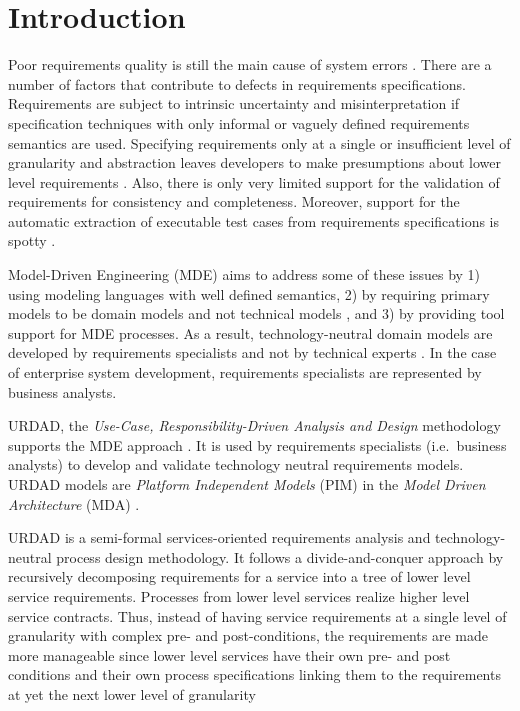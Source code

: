 \section{Introduction}

Poor requirements quality is still the main cause of system errors \cite{heck_experiences_2008,_strategies_2011}. There are a number of factors that contribute to defects in requirements specifications. Requirements are subject to intrinsic uncertainty and misinterpretation if specification techniques with only informal or vaguely defined requirements semantics \cite{ferguson_empirical_2006} are used. Specifying requirements only at a single or insufficient level of granularity and abstraction leaves developers to make presumptions about lower level requirements \cite{espana_evaluating_2009, getBetterReference}. Also, there is only very limited support for the validation of requirements for consistency and completeness. Moreover, support for the automatic extraction of executable test cases from requirements specifications is spotty \cite{bashardoust-tajali_extracting_2008}.

Model-Driven Engineering (MDE) \cite{schmidt_model_2006} aims to address some of these issues by 1) using modeling languages with well defined semantics, 2) by requiring primary models to be domain models and not technical models \cite{asnina_computation_2010}, and 3) by providing tool support for MDE processes. As a result, technology-neutral domain models are developed by requirements specialists and not by technical experts \cite{asnina_computation_2010}. In the case of enterprise system development, requirements specialists are represented by business analysts.

URDAD, the {\em Use-Case, Responsibility-Driven Analysis and Design} \cite{fritz_solms_technology_2007} methodology supports the MDE approach \cite{solms_urdad_2010}. It is used by requirements specialists (i.e.\ business analysts) to develop and validate technology neutral requirements models. URDAD models are {\em Platform Independent Models} (PIM) in the {\em Model Driven Architecture} (MDA) \cite{solms_urdad_2010}.

URDAD is a semi-formal services-oriented requirements analysis and tech\-no\-logy-neutral process design methodology. It follows a divide-and-conquer approach by recursively decomposing requirements for a service into a tree of lower level service requirements. Processes from lower level services realize higher level service contracts. Thus, instead of having service requirements at a single level of granularity with complex pre- and post-conditions, the requirements are made more manageable since lower level services have their own pre- and post conditions and their own process specifications linking them to the requirements at yet the next lower level of granularity

